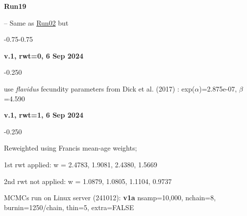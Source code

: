 \hypertarget{R19}{\textbf{Run19}} -- Same as \hyperlink{R02}{Run02} but
\begin{itemize_csas}{-0.75}{-0.75}
	\item \textbf{v.1, rwt=0, 6 Sep 2024}
	\begin{itemize_csas}{-0.25}{0}
		\item use \emph{flavidus} fecundity parameters from Dick et al. (2017) : exp($\alpha$)=2.875e-07, $\beta$=4.590
	\end{itemize_csas}
	\item \textbf{v.1, rwt=1, 6 Sep 2024}
	\begin{itemize_csas}{-0.25}{0}
		\item Reweighted using Francis mean-age weights;
		\item 1st rwt applied: w = 2.4783, 1.9081, 2.4380, 1.5669
		\item 2nd rwt not applied: w = 1.0879, 1.0805, 1.1104, 0.9737
		\item MCMCs run on Linux server (241012): \textbf{v1a} nsamp=10,000, nchain=8, burnin=1250/chain, thin=5, extra=FALSE
	\end{itemize_csas}
\end{itemize_csas}

